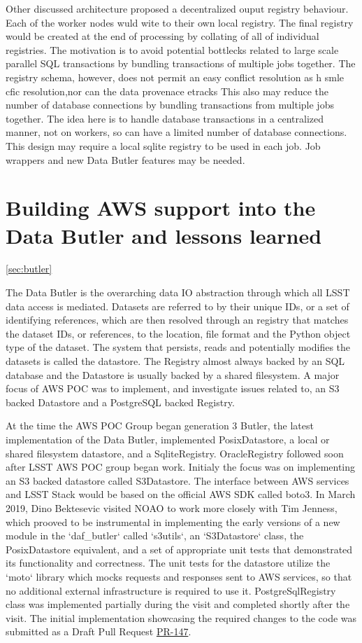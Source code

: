 Other discussed architecture proposed a decentralized ouput registry behaviour. Each of the worker nodes wuld wite to their own local registry. The final registry would be created at the end of processing by collating of all of individual registries. The motivation is to avoid potential bottlecks related to large scale parallel SQL transactions by bundling transactions of multiple jobs together. The registry schema, however, does not permit an easy conflict resolution as h smle cfic resolution,nor can the data provenace etracks
This also may reduce the number of database connections by bundling transactions from multiple jobs together.
The idea here is to handle database transactions in a centralized manner, not on workers, so can have a limited number of database connections.
This design may require a local sqlite registry to be used in each job.
Job wrappers and new Data Butler features may be needed.


\section{Building AWS support into the Data Butler and lessons learned}
\ref{sec:butler}

The Data Butler is the overarching data IO abstraction through which all LSST data access is mediated. Datasets are referred to by their unique IDs, or a set of identifying references, which are then resolved through an registry that matches the dataset IDs, or references, to the location, file format and the Python object type of the dataset. The system that persists, reads and potentially modifies the datasets is called the datastore. The Registry almost always backed by an SQL database and the Datastore is usually backed by a shared filesystem. A major focus of AWS POC was to implement, and investigate issues related to, an S3 backed Datastore and a PostgreSQL backed Registry.

At the time the AWS POC Group began generation 3 Butler, the latest implementation of the Data Butler, implemented PosixDatastore, a local or shared filesystem datastore, and a SqliteRegistry. OracleRegistry followed soon after LSST AWS POC group began work. Initialy the focus was on implementing an S3 backed datastore called S3Datastore. The interface between AWS services and LSST Stack would be based on the official AWS SDK called boto3. In March 2019, Dino Bektesevic visited NOAO to work more closely with Tim Jenness, which prooved to be instrumental in implementing the early versions of a new module in the `daf\_butler` called `s3utils`, an `S3Datastore` class, the PosixDatastore equivalent, and a set of appropriate unit tests that demonstrated its functionality and correctness. The unit tests for the datastore utilize the `moto` library which mocks requests and responses sent to AWS services, so that no additional external infrastructure is required to use it. PostgreSqlRegistry class was implemented partially during the visit and completed shortly after the visit. The initial implementation showcasing the required changes to the code was submitted as a Draft Pull Request \href{https://github.com/lsst/daf_butler/pull/147}{PR-147}. 

